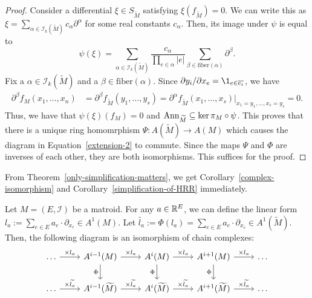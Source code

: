 \documentclass{puthesis-UG}
\begin{document}
\begin{proof}
Consider a differential $\xi \in S_{\widetilde{M}}$ satisfying $\xi(f_{\widetilde{M}}) = 0$. We can write this as $\xi = \sum_{\alpha \in \mathcal{I}_k (\widetilde{M})} c_\alpha \partial^\alpha$ for some real constants $c_\alpha$. Then, its image under $\psi$ is equal to
\[
	\psi(\xi) = \sum_{\alpha \in \mathcal{I}_k (\widetilde{M})} \frac{c_\alpha}{\prod_{e \in \alpha} |e|}\sum_{\beta \in \text{fiber}(\alpha)} \partial^\beta.
\]
Fix a $\alpha \in \mathcal{I}_k(\widetilde{M})$ and a $\beta \in \text{fiber}(\alpha)$. Since $\partial y_i / \partial x_e = \1_{e \in \overline{e_i}}$, we have  
\begin{align*}
	\partial^\beta f_M (x_1, \ldots, x_n) & = \partial^\beta f_{\widetilde{M}} (y_1, \ldots, y_s) = \partial^\alpha f_{\widetilde{M}} (x_1, \ldots, x_s) |_{x_1 = y_1, \ldots, x_s = y_s} = 0.
\end{align*}
Thus, we have that $\psi (\xi)(f_M) = 0$ and $\operatorname{Ann}_{\widetilde{M}} \subseteq \ker \pi_M \circ \psi$. This proves that there is a unique ring homomrphism $\Psi : A(\widetilde{M}) \to A(M)$ which causes the diagram in Equation~\ref{extension-2} to commute. Since the maps $\Psi$ and $\Phi$ are inverses of each other, they are both isomorphisms. This suffices for the proof.
\end{proof}

From Theorem~\ref{only-simplification-matters}, we get Corollary~\ref{complex-isomorphism} and Corollary~\ref{simplification-of-HRR} immediately. 

\begin{cor} \label{complex-isomorphism}
	Let $M = (E, \mathcal{I})$ be a matroid. For any $a \in \mathbb{R}^E$, we can define the linear form $l_a := \sum_{e \in E} a_e \cdot \partial_{x_e} \in A^1(M)$. Let $\widetilde{l_a} := \Phi(l_a) = \sum_{e \in E} a_e \cdot \partial_{x_{\overline{e}}} \in A^1(\widetilde{M})$. Then, the following diagram is an isomorphism of chain complexes:
	\[\begin{tikzcd}
	\ldots & {A^{i-1}(M)} & {A^i(M)} & {A^{i+1}(M)} & \ldots \\
	\ldots & {A^{i-1}(\widetilde{M})} & {A^i(\widetilde{M})} & {A^{i+1}(\widetilde{M})} & \ldots
	\arrow["{\times l_a}", from=1-1, to=1-2]
	\arrow["{\times \widetilde{l_a}}", from=2-1, to=2-2]
	\arrow["\Phi"', from=1-2, to=2-2]
	\arrow["{\times l_a}", from=1-2, to=1-3]
	\arrow["{\times \widetilde{l_a}}", from=2-2, to=2-3]
	\arrow["{\times l_a}", from=1-3, to=1-4]
	\arrow["{\times \widetilde{l_a}}", from=2-3, to=2-4]
	\arrow["\Phi"', from=1-3, to=2-3]
	\arrow["\Phi"', from=1-4, to=2-4]
	\arrow["{\times l_a}", from=1-4, to=1-5]
	\arrow["{\times \widetilde{l_a}}", from=2-4, to=2-5]
\end{tikzcd}\]
 \end{cor}
\end{document}
